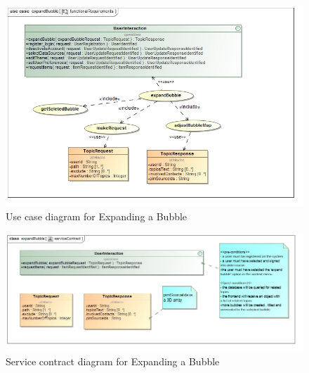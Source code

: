 \documentclass[hidelinks,english]{article}
\begin{document}
			    \begin{figure}[!h]
    			\includegraphics[width=\linewidth]{expandBubbleFunctionalRequirements.jpg}
    			\caption{Use case diagram for Expanding a Bubble}
    			\label{UseCaseExpandBubble}
    			\end{figure}
    			
    			\begin{figure}[!h]
    			\includegraphics[width=\linewidth]{expandBubbleServiceContract.jpg}
    			\caption{Service contract diagram for Expanding a Bubble}
    			\label{ServiceContractExpandBubble}
    			\end{figure}
			    
\end{document}
